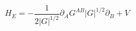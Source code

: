 \begin{equation}
H_E = -\frac{1}{2|G|^{1/2}}\partial_AG^{AB}|G|^{1/2}\partial_B + V
\label{2.9}
\end{equation}

